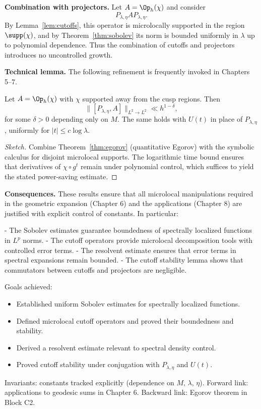 \medskip

\textbf{Combination with projectors.} Let $A = \Op_h(\chi)$ and consider
\[
P_{\lambda,\eta} A P_{\lambda,\eta}.
\]
By Lemma~\ref{lem:cutoffs}, this operator is microlocally supported in the region $\supp(\chi)$, and by Theorem~\ref{thm:sobolev} its norm is bounded uniformly in $\lambda$ up to polynomial dependence. Thus the combination of cutoffs and projectors introduces no uncontrolled growth.

\medskip

\textbf{Technical lemma.} The following refinement is frequently invoked in Chapters 5–7.

\begin{lemma}\label{lem:cutoff-stability}
Let $A = \Op_h(\chi)$ with $\chi$ supported away from the cusp regions. Then
\[
\| [P_{\lambda,\eta}, A] \|_{L^2 \to L^2} \ll h^{1-\delta},
\]
for some $\delta > 0$ depending only on $M$. The same holds with $U(t)$ in place of $P_{\lambda,\eta}$, uniformly for $|t| \leq c \log \lambda$.
\end{lemma}

\begin{proof}[Sketch]
Combine Theorem~\ref{thm:egorov} (quantitative Egorov) with the symbolic calculus for disjoint microlocal supports. The logarithmic time bound ensures that derivatives of $\chi \circ g^t$ remain under polynomial control, which suffices to yield the stated power-saving estimate.
\end{proof}

\medskip

\textbf{Consequences.} These results ensure that all microlocal manipulations required in the geometric expansion (Chapter 6) and the applications (Chapter 8) are justified with explicit control of constants. In particular:

- The Sobolev estimates guarantee boundedness of spectrally localized functions in $L^p$ norms.
- The cutoff operators provide microlocal decomposition tools with controlled error terms.
- The resolvent estimate ensures that error terms in spectral expansions remain bounded.
- The cutoff stability lemma shows that commutators between cutoffs and projectors are negligible.

\medskip

\begin{auditblock}[C3]
Goals achieved:
\begin{itemize}
  \item Established uniform Sobolev estimates for spectrally localized functions.
  \item Defined microlocal cutoff operators and proved their boundedness and stability.
  \item Derived a resolvent estimate relevant to spectral density control.
  \item Proved cutoff stability under conjugation with $P_{\lambda,\eta}$ and $U(t)$.
\end{itemize}
Invariants: constants tracked explicitly (dependence on $M$, $\lambda$, $\eta$). Forward link: applications to geodesic sums in Chapter 6. Backward link: Egorov theorem in Block C2.
\end{auditblock}
